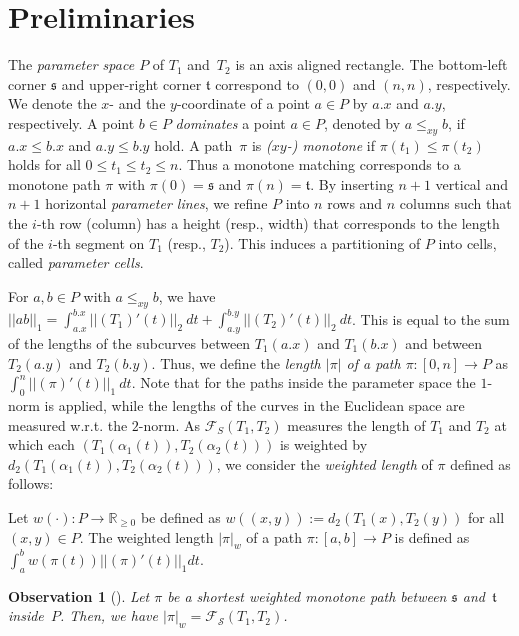 \documentclass[a4paper,11pt]{article}
\newtheorem{observation}{Observation}
\begin{document}
\section{Preliminaries} \label{sec:prelim}
The \emph{parameter space $P$} of $T_1$ and~$T_2$ is an axis aligned rectangle. The bottom-left corner $\mathfrak{s}$ and  upper-right corner  $\mathfrak{t}$  correspond to $(0,0)$ and $(n,n)$, respectively. We denote the $x$- and the $y$-coordinate of a point $a \in P$ by $a.x$ and $a.y$, respectively. A point $b \in P$ \emph{dominates} a point $a \in P$, denoted by $a \leq_{xy} b$, if $a.x \leq b.x$ and $a.y \leq b.y$ hold. A path~$\pi$ is \emph{($xy$-) monotone} if $\pi(t_1) \leq \pi(t_2)$ holds for all $0\leq t_1\leq t_2 \leq n$. Thus a monotone matching corresponds to a monotone path $\pi$ with $\pi(0) = \mathfrak{s}$ and $\pi(n) = \mathfrak{t}$. By inserting $n+1$ vertical and $n+1$ horizontal \emph{parameter lines}, we refine $P$ into $n$ rows and $n$ columns such that the $i$-th row (column) has a height (resp., width) that corresponds to the length of the $i$-th segment on $T_1$ (resp., $T_2$).  This induces a partitioning of $P$ into cells,  called \emph{parameter cells}.
	
	For $a,b \in P$ with $a \leq_{xy} b$, we have $||ab||_1 = \int_{a.x}^{b.x} ||(T_1)'(t)||_2 \ dt + \int_{a.y}^{b.y} ||(T_2)'(t)||_2 \ dt$. This is equal to the sum of the lengths of the subcurves between $T_1(a.x)$ and $T_1(b.x)$ and between $T_2(a.y)$ and $T_2(b.y)$. Thus, we define the \emph{length $|\pi|$ of a path $\pi: [0,n] \rightarrow P$} as $\int_{0}^{n}||(\pi)'(t)||_1 \ dt$. Note that for the paths inside the parameter space  the $1$-norm is applied, while the lengths of the curves in the Euclidean space are measured w.r.t. the $2$-norm. As $\mathcal{F}_S(T_1,T_2)$ measures the length of $T_1$ and $T_2$ at which each $(T_1(\alpha_1(t)),T_2(\alpha_2(t)))$ is weighted by $d_2 (T_1(\alpha_1(t)),T_2(\alpha_2(t)))$, we consider the \emph{weighted length} of $\pi$ defined as follows:
	
Let $w(\cdot) : P \rightarrow \mathbb{R}_{\geq 0}$ be defined as $w((x,y)) := d_2 (T_1(x), T_2(y))$ for all $(x,y) \in P$. The weighted length $|\pi|_w$ of a path $\pi : [a,b] \rightarrow P$ is defined as $\int_a^b w \left( \pi \left( t \right) \right)  || (\pi)' \left( t \right) ||_1 dt.$	


\begin{observation}[\cite{buchin:phd}]\label{obs:dualpaths}
	Let $\pi$ be a shortest weighted monotone path between $\mathfrak{s}$ and~$\mathfrak{t}$ inside~$P$. Then, we have $|\pi|_w = \mathcal{F}_{\mathcal{S}} \left( T_1, T_2 \right)$.
\end{observation}	
	
\end{document}

